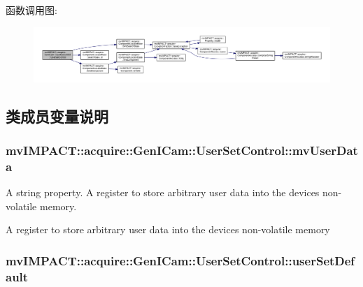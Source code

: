 函数调用图\+:
\nopagebreak
\begin{figure}[H]
\begin{center}
\leavevmode
\includegraphics[width=350pt]{classmv_i_m_p_a_c_t_1_1acquire_1_1_gen_i_cam_1_1_user_set_control_a1a339e0bc4f721897a7e832c87695810_cgraph}
\end{center}
\end{figure}




\subsection{类成员变量说明}
\hypertarget{classmv_i_m_p_a_c_t_1_1acquire_1_1_gen_i_cam_1_1_user_set_control_a61f312cf670c4a3415f5f57d1b9e160d}{
\subsubsection[{mv\+User\+Data}]{ mv\+I\+M\+P\+A\+C\+T\+::acquire\+::\+Gen\+I\+Cam\+::\+User\+Set\+Control\+::mv\+User\+Data}}\label{classmv_i_m_p_a_c_t_1_1acquire_1_1_gen_i_cam_1_1_user_set_control_a61f312cf670c4a3415f5f57d1b9e160d}


A string property. A register to store arbitrary user data into the devices non-\/volatile memory. 

A register to store arbitrary user data into the devices non-\/volatile memory \hypertarget{classmv_i_m_p_a_c_t_1_1acquire_1_1_gen_i_cam_1_1_user_set_control_a976dc234c6b9d625d574c137fe732948}{
\subsubsection[{user\+Set\+Default}]{ mv\+I\+M\+P\+A\+C\+T\+::acquire\+::\+Gen\+I\+Cam\+::\+User\+Set\+Control\+::user\+Set\+Default}}\label{classmv_i_m_p_a_c_t_1_1acquire_1_1_gen_i_cam_1_1_user_set_control_a976dc234c6b9d625d574c137fe732948}


